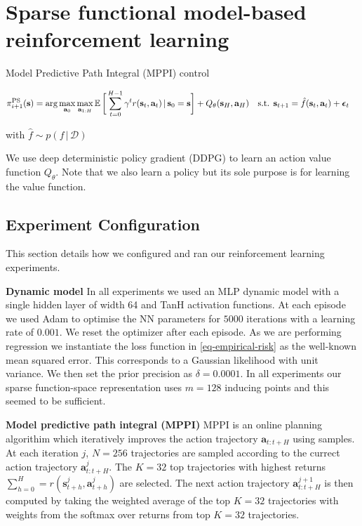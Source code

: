 \documentclass{article}
\newcommand{\state}{\ensuremath{\mathbf{s}}}
\newcommand{\action}{\ensuremath{\mathbf{a}}}
\newcommand{\noise}{\ensuremath{\bm\epsilon}}
\newcommand{\dataset}{\ensuremath{\mathcal{D}}}
\newcommand{\Horizon}{\ensuremath{H}}
\newcommand{\transitionFn}{\ensuremath{f}}
\newcommand{\policy}{\ensuremath{\pi}}
\renewcommand{\mid}{\,|\,}
\begin{document}
\section{Sparse functional model-based reinforcement learning}
\label{app:rl}


Model Predictive Path Integral (MPPI) control
\cite{panSample2015}
\cite{williamsModel2017}

\begin{align} \label{eq-fast-update-mpc}
  \policy_{i+1}^{\text{PS}}(\state) = \arg \max_{\action_{0}} \max_{\action_{1:\Horizon}}
\E \bigg[ \sum_{t=0}^{H-1} \gamma^{t} r(\state_{t},\action_{t}) \mid \state_{0}=\state  \bigg] + Q_{\theta}(\state_{\Horizon}, \action_{H})
\quad \text{s.t. } \state_{t+1} &= \hat{\transitionFn}(\state_{t}, \action_{t}) + \noise_{t}
\end{align}

with $\hat{\transitionFn} \sim p(\transitionFn \mid \dataset)$

We use deep deterministic policy gradient (DDPG) \cite{lillicrapContinuousControlDeep2016} to learn an action value function $Q_{\theta}$.
Note that we also learn a policy but its sole purpose is for learning the value function.

\subsection{Experiment Configuration}
This section details how we configured and ran our reinforcement learning experiments.

\textbf{Dynamic model}
In all experiments we used an MLP dynamic model with a single hidden layer of width 64 and TanH activation functions.
At each episode we used Adam \cite{adam} to optimise the NN parameters for $5000$ iterations with a learning rate of $0.001$.
We reset the optimizer after each episode.
As we are performing regression we instantiate the loss function in \cref{eq-empirical-risk} as the well-known mean squared error.
This corresponds to a Gaussian likelihood with unit variance.
We then set the prior precision as $\delta=0.0001$.
In all experiments our sparse function-space representation uses $m=128$ inducing points and this seemed to be sufficient.



\textbf{Model predictive path integral (MPPI)}
MPPI is an online planning algorithim which iteratively improves the action trajectory $\action_{t:t+H}$ using samples.
At each iteration $j$, $N=256$ trajectories are sampled according to the currect action trajectory $\action^{j}_{t:t+H}$.
The $K=32$ top trajectories with highest returns $\sum_{h=0}^{H} = r(\state^{j}_{t+h}, \action^{j}_{t+h})$ are selected.
The next action trajectory $\action^{j+1}_{t:t+H}$ is then computed by taking the weighted average of the top $K=32$ trajectories
with weights from the softmax over returns from top $K=32$ trajectories.
\end{document}
